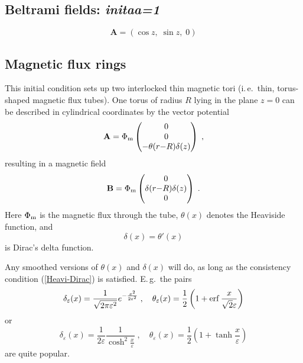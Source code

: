 \documentclass[12pt,twoside,notitlepage,a4paper]{article}
\makeatletter
\newcommand{\var}[1]{\textsl{#1}\index{#1@\emph{#1}}\/}
\newcommand{\erf}     {\mathop{\rm erf}\nolimits}
\newcommand{\vekt}[1] {\mathbf{#1}}
\newcommand{\Av}            {\vekt{A}}
\newcommand{\Bv}            {\vekt{B}}
\newcommand{\Heavi}         {\theta}
\makeatother
\begin{document}
\subsection{Beltrami fields: \var{initaa=1}}

\begin{equation}
\Av=(\cos z,\;\sin z,\;0)
\label{Beltrami}
\end{equation}


\subsection{Magnetic flux rings}

This initial condition sets up two interlocked thin magnetic tori
(i.\,e.~thin, torus-shaped magnetic flux tubes).
One torus of radius $R$ lying in the plane $z=0$ can be described in
cylindrical coordinates by the
vector potential
\begin{equation} \label{Av-flux-ring-cyl}
  \Av = 
  \Phi_{\rm m}
  \begin{pmatrix}
    0\\ 0\\ -\Heavi(r{-}R) \delta(z)
  \end{pmatrix} \; ,
\end{equation}
resulting in a magnetic field
\begin{equation}
  \Bv = 
  \Phi_{\rm m}
  \begin{pmatrix}
    0\\ \delta(r{-}R) \delta(z)\\ 0
  \end{pmatrix} \; .
\end{equation}
Here $\Phi_{\rm m}$ is the magnetic flux through the tube,
$\Heavi(x)$ denotes the Heaviside function, and
\begin{equation} \label{Heavi-Dirac}
 \delta(x) = \Heavi'(x)
\end{equation}
is Dirac's delta function.

Any smoothed versions of $\Heavi(x)$ and $\delta(x)$ will do, as long as
the consistency condition (\ref{Heavi-Dirac}) is satisfied.
E.\,g.~the pairs
\begin{equation}
  \delta_\varepsilon(x)
  = \frac{1}{\sqrt{2\pi\varepsilon^2}} e^{-\frac{x^2}{2\varepsilon^2}} \; ,
  \quad
  \Heavi_\varepsilon(x)
  = \frac{1}{2} \left( 1 + \erf\frac{x}{\sqrt{2}\varepsilon} \right)
\end{equation}
or
\begin{equation}
  \delta_\varepsilon(x)
  = \frac{1}{2\varepsilon}\frac{1}{\cosh^2\frac{x}{\varepsilon}} \; ,
  \quad
  \Heavi_\varepsilon(x)
  = \frac{1}{2} \left( 1 + \tanh\frac{x}{\varepsilon} \right)
\end{equation}
are quite popular.
\end{document}
